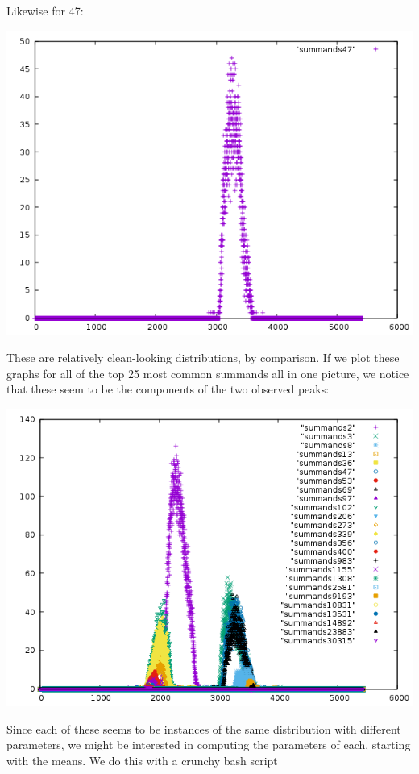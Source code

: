 \documentclass{article}
\theoremstyle{definition}
\theoremstyle{remark}
\numberwithin{equation}{section}
\begin{document}
{Likewise for 47:

\includegraphics[scale=0.5]{../figs/summands47.png}

These are relatively clean-looking distributions, by comparison.  If
we plot these graphs for all of the top 25 most common summands all in
one picture, we notice that these seem to be the components of the two
observed peaks:

\includegraphics[scale=0.5]{../figs/summands_mod_5422.png}

Since each of these seems to be instances of the same distribution
with different parameters, we might be interested in computing the
parameters of each, starting with the means.  We do this with a crunchy bash script


}
\end{document}
